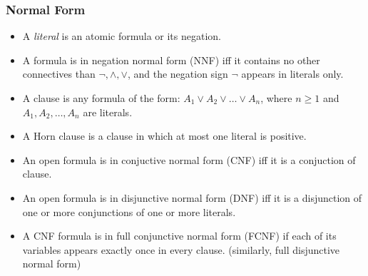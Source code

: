 \documentclass[UTF8,aspectratio=43,11pt,colorlinks,compress,openany]{beamer}%
\begin{document}
\begin{frame}\frametitle{Normal Form}
	\begin{itemize}
		\item A \emph{literal} is an atomic formula or its negation.
		\item A formula is in negation normal form (NNF) iff it contains no other connectives than $\neg, \wedge, \vee$, and the negation sign $\neg$ appears in literals only.
		\item A clause is any formula of the form: $A_1\vee A_2\vee\dots\vee A_n$, where $n\geq 1$ and $A_1, A_2,\dots, A_n$ are literals.
		\item A Horn clause is a clause in which at most one literal is positive.
		\item An open formula is in conjuctive normal form (CNF) iff it is a conjuction of clause.
		\item An open formula is in disjunctive normal form (DNF) iff it is a disjunction of one or more conjunctions of one or more literals.
		\item A CNF formula is in full conjunctive normal form (FCNF) if each of its variables appears exactly once in every clause. (similarly, full disjunctive normal form)
	\end{itemize}
\end{frame}
\end{document}
